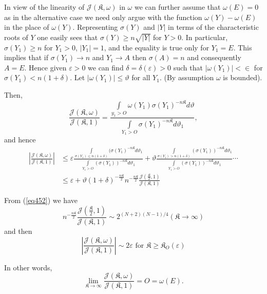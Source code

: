 In view of the linearity of $\mathcal{J}(\mathfrak{K},\omega)$ in
$\omega$ we can further assume that $\omega(E) = 0$ as in the
alternative case we need only argue with the function $\omega(Y) -
\omega (E)$ in the place of $\omega (Y)$. Representing $\sigma (Y)$
and $|Y|$ in terms of the characteristic roots of $Y$ one easily sees
that $\sigma (Y) \ge n \sqrt{|Y|}$ for $Y > 0$. In particular, $\sigma
(Y_1) \ge n$ for $Y_1 > 0$, $| Y_1 | = 1$, and the equality is true
only for $Y_1 = E$. This implies that if $\sigma(Y_1) \rightarrow n$
and $Y_1 \rightarrow A$ then $\sigma (A) = n$ and consequently $A =
E$. Hence given $\varepsilon > 0$ we can find $\delta = \delta
(\varepsilon) > 0$ such 
that $|\omega (Y_1) | < \in $ for $\sigma (Y_1) < n(1+\delta)$. Let
$|\omega (Y_1)| \le \vartheta $ for all $Y_1$. (By assumption $\omega$
is bounded). 

Then,
$$
\frac{\mathcal{J}(\mathfrak{K},\omega)}{\mathcal{J}(\mathfrak{K},1)} =
\frac{\int\limits_{y_1 > O}\omega(Y_1)\sigma(Y_1)^{-n\mathfrak{K}}   d
  \vartheta}{\int\limits_{Y_1 > O} \sigma(Y_1)^{-n\mathfrak{K}}
  d\vartheta_1}, 
$$
and hence
{\fontsize{10pt}{12pt}\selectfont
\begin{align*}
\left|
\frac{\mathcal{J}(\mathfrak{K},\omega)}{\mathcal{J}(\mathfrak{K},1)}
\right| 
& \le    \varepsilon   \frac{\int\limits_{\sigma(Y_1)   \le   n(1 +
    \delta)}   (\sigma(Y_1)^{-n\mathfrak{K}}
  d{\vartheta_1}}{\int\limits_{Y_1 > O}(\sigma(Y_1))^{-n\mathfrak{K}}
  d\vartheta_1} + \vartheta   \frac{ \int\limits_{\sigma(Y_1) > n(1 +
    \delta)} (\sigma(Y_1))^{-n\mathfrak{K}}
  d\vartheta_1}{\int\limits_{Y_{1} > O} ( \sigma (Y_1)
  )^{-n\mathfrak{K}}   d \vartheta_1 } \cdots\\ 
& \le   \varepsilon + \vartheta(1 + \delta)^{-\frac{n\mathfrak{K}}{2}}
n^{-\frac{n\mathfrak{K}}{2}}
\frac{\mathcal{J}(\frac{\mathfrak{K}}{2},1)}{\mathcal{J}(\mathfrak{K},1)} 
\end{align*}}\relax\pageoriginale

From (\ref{eq452}) we have
$$
n^{-\frac{n\mathfrak{K}}{2}}
\frac{\mathcal{J}(\frac{\mathfrak{K}}{2},1)}{\mathcal{J}(\mathfrak{K},1)}
\sim   2^{(N+2)(N-1)/4}   (\mathfrak{K} \rightarrow \infty) 
$$
and then
$$
\left |
\frac{\mathcal{J}(\mathfrak{K},\omega)}{\mathcal{J}(\mathfrak{K},1)}
\right |   \sim   2 \varepsilon \text{ for } \mathfrak{K} \ge
\mathfrak{K}_O(\varepsilon) 
$$

In other words,
$$
\lim_{\mathfrak{K}\rightarrow \infty}
\frac{\mathcal{J}(\mathfrak{K},\omega)}{\mathcal{J}(\mathfrak{K},1)} = O
= \omega(E). 
$$

